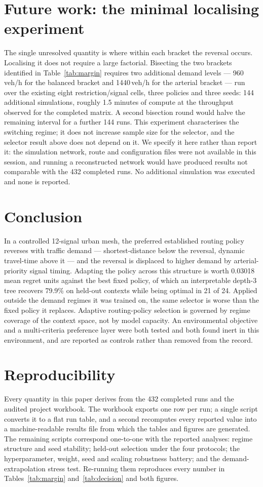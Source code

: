 \documentclass[10pt,a4paper]{article}
\begin{document}
\section{Future work: the minimal localising experiment}\label{sec:future}
The single unresolved quantity is where within each bracket the reversal occurs. Localising it does not require a large factorial. Bisecting the two brackets identified in Table~\ref{tab:margin} requires two additional demand levels --- 960\,veh/h for the balanced bracket and 1440\,veh/h for the arterial bracket --- run over the existing eight restriction/signal cells, three policies and three seeds: 144 additional simulations, roughly 1.5 minutes of compute at the throughput observed for the completed matrix. A second bisection round would halve the remaining interval for a further 144 runs. This experiment characterises the switching regime; it does not increase sample size for the selector, and the selector result above does not depend on it. We specify it here rather than report it: the simulation network, route and configuration files were not available in this session, and running a reconstructed network would have produced results not comparable with the 432 completed runs. No additional simulation was executed and none is reported.

\section{Conclusion}
In a controlled 12-signal urban mesh, the preferred established routing policy reverses with traffic demand --- shortest-distance below the reversal, dynamic travel-time above it --- and the reversal is displaced to higher demand by arterial-priority signal timing. Adapting the policy across this structure is worth 0.03018 mean regret units against the best fixed policy, of which an interpretable depth-3 tree recovers 79.9\% on held-out contexts while being optimal in 21 of 24. Applied outside the demand regimes it was trained on, the same selector is worse than the fixed policy it replaces. Adaptive routing-policy selection is governed by regime coverage of the context space, not by model capacity. An environmental objective and a multi-criteria preference layer were both tested and both found inert in this environment, and are reported as controls rather than removed from the record.

\section{Reproducibility}
Every quantity in this paper derives from the 432 completed runs and the audited project workbook. The workbook exports one row per run; a single script converts it to a flat run table, and a second recomputes every reported value into a machine-readable results file from which the tables and figures are generated. The remaining scripts correspond one-to-one with the reported analyses: regime structure and seed stability; held-out selection under the four protocols; the hyperparameter, weight, seed and scaling robustness battery; and the demand-extrapolation stress test. Re-running them reproduces every number in Tables~\ref{tab:margin} and~\ref{tab:decision} and both figures.
\end{document}
